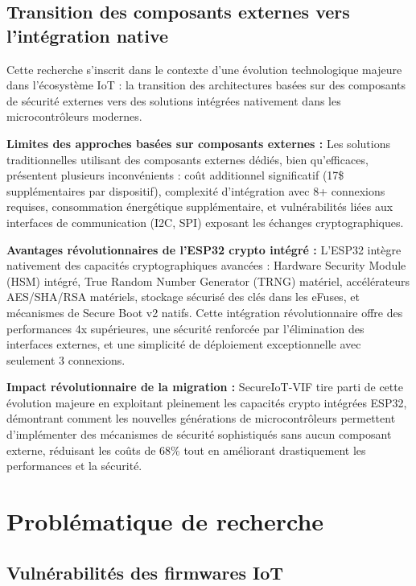 \subsection{Transition des composants externes vers l'intégration native}

Cette recherche s'inscrit dans le contexte d'une évolution technologique majeure dans l'écosystème IoT : la transition des architectures basées sur des composants de sécurité externes vers des solutions intégrées nativement dans les microcontrôleurs modernes.

\textbf{Limites des approches basées sur composants externes :} Les solutions traditionnelles utilisant des composants externes dédiés, bien qu'efficaces, présentent plusieurs inconvénients : coût additionnel significatif (17\$ supplémentaires par dispositif), complexité d'intégration avec 8+ connexions requises, consommation énergétique supplémentaire, et vulnérabilités liées aux interfaces de communication (I2C, SPI) exposant les échanges cryptographiques.

\textbf{Avantages révolutionnaires de l'ESP32 crypto intégré :} L'ESP32 intègre nativement des capacités cryptographiques avancées : Hardware Security Module (HSM) intégré, True Random Number Generator (TRNG) matériel, accélérateurs AES/SHA/RSA matériels, stockage sécurisé des clés dans les eFuses, et mécanismes de Secure Boot v2 natifs. Cette intégration révolutionnaire offre des performances 4x supérieures, une sécurité renforcée par l'élimination des interfaces externes, et une simplicité de déploiement exceptionnelle avec seulement 3 connexions.

\textbf{Impact révolutionnaire de la migration :} SecureIoT-VIF tire parti de cette évolution majeure en exploitant pleinement les capacités crypto intégrées ESP32, démontrant comment les nouvelles générations de microcontrôleurs permettent d'implémenter des mécanismes de sécurité sophistiqués sans aucun composant externe, réduisant les coûts de 68\% tout en améliorant drastiquement les performances et la sécurité.

\section{Problématique de recherche}

\subsection{Vulnérabilités des firmwares IoT}

